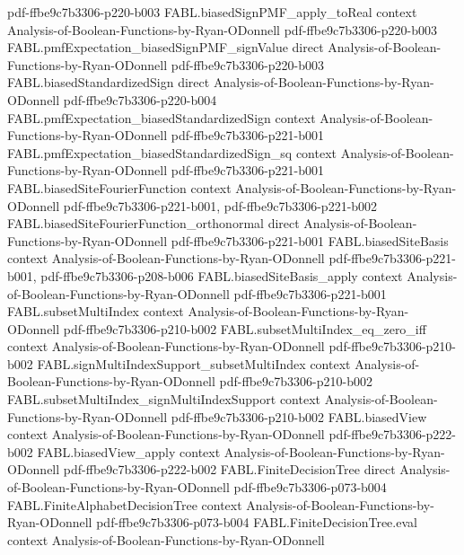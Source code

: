 \begin{theorem}
  {pdf-ffbe9c7b3306-p220-b003}
\proofstep
  {FABL.biasedSignPMF_apply_toReal}
  {context}
  {Analysis-of-Boolean-Functions-by-Ryan-ODonnell}
  {pdf-ffbe9c7b3306-p220-b003}
\proofstep
  {FABL.pmfExpectation_biasedSignPMF_signValue}
  {direct}
  {Analysis-of-Boolean-Functions-by-Ryan-ODonnell}
  {pdf-ffbe9c7b3306-p220-b003}
\proofstep
  {FABL.biasedStandardizedSign}
  {direct}
  {Analysis-of-Boolean-Functions-by-Ryan-ODonnell}
  {pdf-ffbe9c7b3306-p220-b004}
\proofstep
  {FABL.pmfExpectation_biasedStandardizedSign}
  {context}
  {Analysis-of-Boolean-Functions-by-Ryan-ODonnell}
  {pdf-ffbe9c7b3306-p221-b001}
\proofstep
  {FABL.pmfExpectation_biasedStandardizedSign_sq}
  {context}
  {Analysis-of-Boolean-Functions-by-Ryan-ODonnell}
  {pdf-ffbe9c7b3306-p221-b001}
\proofstep
  {FABL.biasedSiteFourierFunction}
  {context}
  {Analysis-of-Boolean-Functions-by-Ryan-ODonnell}
  {pdf-ffbe9c7b3306-p221-b001,
    pdf-ffbe9c7b3306-p221-b002}
\proofstep
  {FABL.biasedSiteFourierFunction_orthonormal}
  {direct}
  {Analysis-of-Boolean-Functions-by-Ryan-ODonnell}
  {pdf-ffbe9c7b3306-p221-b001}
\proofstep
  {FABL.biasedSiteBasis}
  {context}
  {Analysis-of-Boolean-Functions-by-Ryan-ODonnell}
  {pdf-ffbe9c7b3306-p221-b001,
    pdf-ffbe9c7b3306-p208-b006}
\proofstep
  {FABL.biasedSiteBasis_apply}
  {context}
  {Analysis-of-Boolean-Functions-by-Ryan-ODonnell}
  {pdf-ffbe9c7b3306-p221-b001}
\proofstep
  {FABL.subsetMultiIndex}
  {context}
  {Analysis-of-Boolean-Functions-by-Ryan-ODonnell}
  {pdf-ffbe9c7b3306-p210-b002}
\proofstep
  {FABL.subsetMultiIndex_eq_zero_iff}
  {context}
  {Analysis-of-Boolean-Functions-by-Ryan-ODonnell}
  {pdf-ffbe9c7b3306-p210-b002}
\proofstep
  {FABL.signMultiIndexSupport_subsetMultiIndex}
  {context}
  {Analysis-of-Boolean-Functions-by-Ryan-ODonnell}
  {pdf-ffbe9c7b3306-p210-b002}
\proofstep
  {FABL.subsetMultiIndex_signMultiIndexSupport}
  {context}
  {Analysis-of-Boolean-Functions-by-Ryan-ODonnell}
  {pdf-ffbe9c7b3306-p210-b002}
\proofstep
  {FABL.biasedView}
  {context}
  {Analysis-of-Boolean-Functions-by-Ryan-ODonnell}
  {pdf-ffbe9c7b3306-p222-b002}
\proofstep
  {FABL.biasedView_apply}
  {context}
  {Analysis-of-Boolean-Functions-by-Ryan-ODonnell}
  {pdf-ffbe9c7b3306-p222-b002}
\proofstep
  {FABL.FiniteDecisionTree}
  {direct}
  {Analysis-of-Boolean-Functions-by-Ryan-ODonnell}
  {pdf-ffbe9c7b3306-p073-b004}
\proofstep
  {FABL.FiniteAlphabetDecisionTree}
  {context}
  {Analysis-of-Boolean-Functions-by-Ryan-ODonnell}
  {pdf-ffbe9c7b3306-p073-b004}
\proofstep
  {FABL.FiniteDecisionTree.eval}
  {context}
  {Analysis-of-Boolean-Functions-by-Ryan-ODonnell}

\end{theorem}
